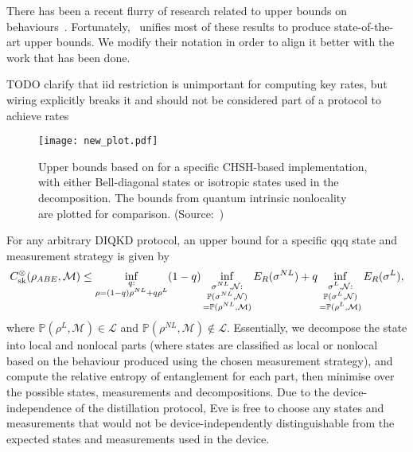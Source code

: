 \documentclass[10pt, a4paper]{article}
\numberwithin{equation}{section} %
\theoremstyle{definition}
\theoremstyle{plain}
\newcommand{\?}{\mathrel{?}} %
\newcommand{\sM}{\mathcal{M}}
\newcommand{\sN}{\mathcal{N}}
\newcommand{\cP}{\mathbb{P}}
\newcommand{\Ls}{\mathcal{L}}
\newcommand{\sk}{\rm sk}
\begin{document}
      There has been a recent flurry of research related to upper bounds on behaviours~\cite{NotSufficient, RevisedPeres, DIQKD_QKD_Gap, CCSquashedEntangle, DIQKD_Limits}. Fortunately,~\cite{CCSquashedEntangle} unifies most of these results to produce state-of-the-art upper bounds. We modify their notation in order to align it better with the work that has been done.

      TODO clarify that iid restriction is unimportant for computing key rates, but wiring explicitly breaks it and should not be considered part of a protocol to achieve rates

      \begin{figure}
        \centering
        \texttt{[image: new\_plot.pdf]}
        \caption[Comparison of upper bounds.]{\label{fig:genubound} Upper bounds based on  for a specific CHSH-based implementation, with either Bell-diagonal states or isotropic states used in the decomposition. The bounds from quantum intrinsic nonlocality~\cite{DIQKD_Limits}~\cite[Appendix B]{RevisedPeres} are plotted for comparison. (Source:~\cite{CCSquashedEntangle})}
      \end{figure}

      For any arbitrary DIQKD protocol, an upper bound for a specific qqq state and measurement strategy is given by~\cite[Thm. 3]{CCSquashedEntangle}
      \begin{equation}\label{eqn:genubound_state}
        C^{\otimes}_{\sk}(\rho_{ABE}, \sM) \leq \inf_{\substack{q : \\ \rho = (1-q)\rho^{NL} + q\rho^L}} (1-q) \inf_{\substack{\sigma^{NL}, \sN : \\ \cP(\sigma^{NL}, \sN) \\ = \cP(\rho^{NL}, \sM) }} E_R(\sigma^{NL}) + q \inf_{\substack{\sigma^L, \sN : \\ \cP(\sigma^L, \sN) \\ = \cP(\rho^L, \sM) }} E_R(\sigma^L),
      \end{equation}
      where \(\cP(\rho^L, \sM) \in \Ls\) and \(\cP(\rho^{NL}, \sM) \not\in \Ls\). Essentially, we decompose the state into local and nonlocal parts (where states are classified as local or nonlocal based on the behaviour produced using the chosen measurement strategy), and compute the relative entropy of entanglement for each part, then minimise over the possible states, measurements and decompositions. Due to the device-independence of the distillation protocol, Eve is free to choose any states and measurements that would not be device-independently distinguishable from the expected states and measurements used in the device.
\end{document}
